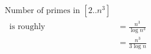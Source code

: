 \documentclass[preview]{standalone}
\begin{document}
\begin{align*}
\text{Number of primes in } [2..n^3]  \\ \
                       \text{ is roughly } &=\frac{n^3}{\log n^3} \\ \
                       &= \frac{n^3}{3 \log n}
\end{align*}
\end{document}
